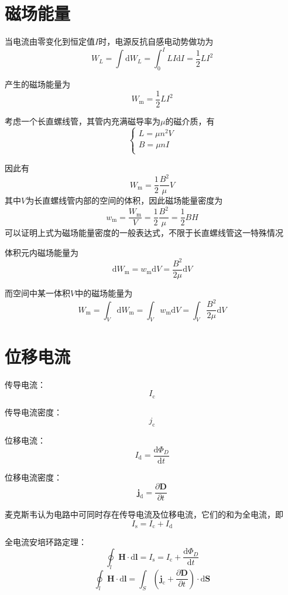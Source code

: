 \documentclass[12pt, a4paper, twoside]{ctexbook}
\begin{document}
\section{磁场能量}
当电流由零变化到恒定值$I$时，电源反抗自感电动势做功为
$$
W_L=\int\mathrm{d}W_L=\int_{0}^{I}LI\mathrm{d}I=\frac{1}{2}LI^2
$$

产生的磁场能量为
$$
W_\mathrm{m}=\frac{1}{2}LI^2
$$

考虑一个长直螺线管，其管内充满磁导率为$\mu$的磁介质，有
$$
\left\{ \begin{array}{l}
	L=\mu n^2V\\
	B=\mu nI\\
\end{array} \right. 
$$

因此有
$$
W_\mathrm{m}=\frac{1}{2}\frac{B^2}{\mu}V
$$
其中$V$为长直螺线管内部的空间的体积，因此磁场能量密度为
$$
w_\mathrm{m}=\frac{W_\mathrm{m}}{V}=\frac{1}{2}\frac{B^2}{\mu}=\frac{1}{2}BH
$$
可以证明上式为磁场能量密度的一般表达式，不限于长直螺线管这一特殊情况

体积元内磁场能量为
$$
\mathrm{d}W_\mathrm{m}=w_\mathrm{m}\mathrm{d}V=\frac{B^2}{2\mu}\mathrm{d}V
$$

而空间中某一体积$V$中的磁场能量为
$$
W_\mathrm{m}=\int_V \mathrm{d}W_\mathrm{m}=\int_V w_\mathrm{m}\mathrm{d}V=\int_V \frac{B^2}{2\mu}\mathrm{d}V
$$
\section{位移电流}
{\sonti 传导电流}：
$$
I_\mathrm{c}
$$

{\sonti 传导电流密度}：
$$
j_\mathrm{c}
$$

{\sonti 位移电流}：
$$
I_\mathrm{d}=\frac{\mathrm{d}\varPhi_D}{\mathrm{d}t}
$$

{\sonti 位移电流密度}：
$$
\boldsymbol{j}_\mathrm{d}=\frac{\partial \boldsymbol{D}}{\partial t}
$$

麦克斯韦认为电路中可同时存在传导电流及位移电流，它们的和为全电流，即
$$
I_\mathrm{s}=I_\mathrm{c}+I_\mathrm{d}
$$

{\sonti 全电流安培环路定理}：
$$
\oint_l \boldsymbol{H}\cdot\mathrm{d}\boldsymbol{l}=I_\mathrm{s}=I_\mathrm{c}+\frac{\mathrm{d}\varPhi_D}{\mathrm{d}t}
$$
$$
\oint_l \boldsymbol{H}\cdot\mathrm{d}\boldsymbol{l}=\int_S\left(\boldsymbol{j}_\mathrm{c}+\frac{\partial \boldsymbol{D}}{\partial t}\right)\cdot\mathrm{d}\boldsymbol{S}
$$
\end{document}
